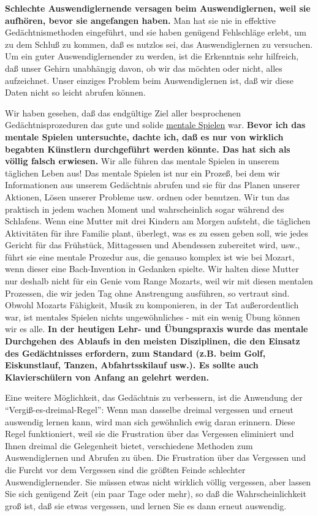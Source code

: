 \textbf{Schlechte Auswendiglernende versagen beim Auswendiglernen, weil sie aufhören, bevor sie angefangen haben.}
Man hat sie nie in effektive Gedächtnismethoden eingeführt, und sie haben genügend Fehlschläge erlebt, um zu dem Schluß zu kommen, daß es nutzlos sei, das Auswendiglernen zu versuchen.
Um ein guter Auswendiglernender zu werden, ist die Erkenntnis sehr hilfreich, daß unser Gehirn unabhängig davon, ob wir das möchten oder nicht, alles aufzeichnet.
Unser einziges Problem beim Auswendiglernen ist, daß wir diese Daten nicht so leicht abrufen können.

Wir haben gesehen, daß das endgültige Ziel aller besprochenen Gedächtnisprozeduren das gute und solide \hyperref[c1ii12mental]{mentale Spielen} war.
\textbf{Bevor ich das mentale Spielen untersuchte, dachte ich, daß es nur von wirklich begabten Künstlern durchgeführt werden könnte.
Das hat sich als völlig falsch erwiesen.}
Wir alle führen das mentale Spielen in unserem täglichen Leben aus!
Das mentale Spielen ist nur ein Prozeß, bei dem wir Informationen aus unserem Gedächtnis abrufen und sie für das Planen unserer Aktionen, Lösen unserer Probleme usw. ordnen oder benutzen.
Wir tun das praktisch in jedem wachen Moment und wahrscheinlich sogar während des Schlafens.
Wenn eine Mutter mit drei Kindern am Morgen aufsteht, die täglichen Aktivitäten für ihre Familie plant, überlegt, was es zu essen geben soll, wie jedes Gericht für das Frühstück, Mittagessen und Abendessen zubereitet wird, usw., führt sie eine mentale Prozedur aus, die genauso komplex ist wie bei Mozart, wenn dieser eine Bach-Invention in Gedanken spielte.
Wir halten diese Mutter nur deshalb nicht für ein Genie vom Range Mozarts, weil wir mit diesen mentalen Prozessen, die wir jeden Tag ohne Anstrengung ausführen, so vertraut sind.
Obwohl Mozarts Fähigkeit, Musik zu komponieren, in der Tat außerordentlich war, ist mentales Spielen nichts ungewöhnliches - mit ein wenig Übung können wir es alle.
\textbf{In der heutigen Lehr- und Übungspraxis wurde das mentale Durchgehen des Ablaufs in den meisten Disziplinen, die den Einsatz des Gedächtnisses erfordern, zum Standard (z.B. beim Golf, Eiskunstlauf, Tanzen, Abfahrtsskilauf usw.).
Es sollte auch Klavierschülern von Anfang an gelehrt werden.}

Eine weitere Möglichkeit, das Gedächtnis zu verbessern, ist die Anwendung der \enquote{Vergiß-es-dreimal-Regel}: Wenn man dasselbe dreimal vergessen und erneut auswendig lernen kann, wird man sich gewöhnlich ewig daran erinnern.
Diese Regel funktioniert, weil sie die Frustration über das Vergessen eliminiert und Ihnen dreimal die Gelegenheit bietet, verschiedene Methoden zum Auswendiglernen und Abrufen zu üben.
Die Frustration über das Vergessen und die Furcht vor dem Vergessen sind die größten Feinde schlechter Auswendiglernender.
Sie müssen etwas nicht wirklich völlig vergessen, aber lassen Sie sich genügend Zeit (ein paar Tage oder mehr), so daß die Wahrscheinlichkeit groß ist, daß sie etwas vergessen, und lernen Sie es dann erneut auswendig.


